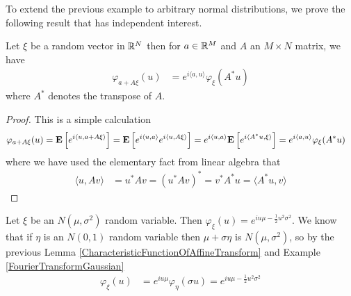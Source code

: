 To extend the previous example to arbitrary normal distributions, we
prove the following result that has independent interest.
\begin{lem}\label{CharacteristicFunctionOfAffineTransform}Let $\xi$ be a random vector in $\mathbb{R}^N$ then for $a \in
  \mathbb{R}^M$ and $A$ an $M \times N$ matrix, we have
\begin{align*}
\varphi_{a + A\xi}(u) &= e^{i\langle a, u \rangle} \varphi_\xi(A^* u)
\end{align*}
where $A^*$ denotes the transpose of $A$.
\end{lem}
\begin{proof}
This is a simple calculation
\begin{align*}
\varphi_{a + A\xi}(u) &= \textbf{E}\left[e^{i \langle u, a + A \xi
    \rangle}\right] = \textbf{E}\left[e^{i \langle u, a \rangle} e^{i \langle u,  A \xi
    \rangle}\right]
= e^{i \langle u, a \rangle}\textbf{E}\left[e^{i \langle A^* u,  \xi
    \rangle}\right] = e^{i\langle a, u \rangle} \varphi_\xi(A^* u)
\end{align*}
where we have used the elementary fact from linear algebra that
\begin{align*}
\langle u,  Av \rangle &= u^*Av = (u^*Av)^* = v^* A^*u = \langle A^*u,  v \rangle
\end{align*}
\end{proof}

\begin{examp}\label{FourierTransformGeneralGaussian}Let $\xi$ be an $N(\mu,\sigma^2)$ random variable.  Then
  $\varphi_\xi(u) = e^{iu\mu - \frac{1}{2} u^2\sigma^2}$.  We know
  that if $\eta$ is an $N(0,1)$ random variable then $\mu +
  \sigma\eta$ is $N(\mu, \sigma^2)$, so by the previous Lemma
  \ref{CharacteristicFunctionOfAffineTransform} and Example \ref{FourierTransformGaussian}
\begin{align*}
\varphi_\xi(u) &= e^{iu\mu} \varphi_\eta(\sigma u) = e^{iu\mu - \frac{1}{2} u^2\sigma^2}
\end{align*}
\end{examp}


